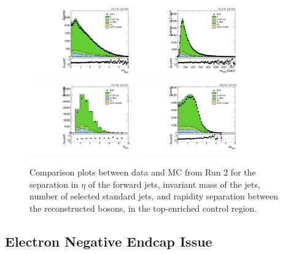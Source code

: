 \begin{figure}[htbp]
  \centering
  \includegraphics[width=0.4\textwidth]{fig/analysis/CR_b1_allL_allP_allC_allE_Run2_lnujj_vbfDEta.pdf}
  \includegraphics[width=0.4\textwidth]{fig/analysis/CR_b1_allL_allP_allC_allE_Run2_lnujj_vbfMass.pdf}\\
  \includegraphics[width=0.4\textwidth]{fig/analysis/CR_b1_allL_allP_allC_allE_Run2_lnujj_nJets.pdf}
  \includegraphics[width=0.4\textwidth]{fig/analysis/CR_b1_allL_allP_allC_allE_Run2_dy.pdf}\\
  \caption{
    Comparison plots between data and MC from Run 2 for the separation in $\eta$ of the \VBF forward jets, invariant mass of the \VBF jets, number of selected standard jets, and rapidity separation between the reconstructed bosons, in the top-enriched control region.
  }
  \label{fig:CR_controlPlotsRun2_4}
\end{figure}

\subsection{Electron Negative Endcap Issue}

